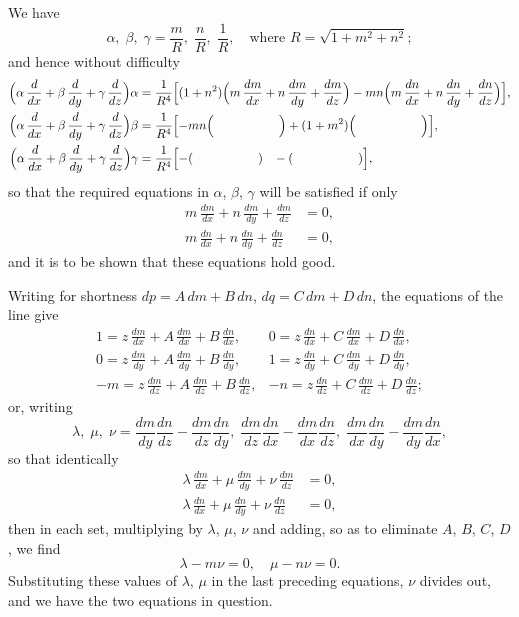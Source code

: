 \documentclass[12pt,a4paper]{article}
\begin{document}
We have
\[
\alpha,\; \beta,\; \gamma = \frac{m}{R},\; \frac{n}{R},\; \frac{1}{R}, \quad \text{where } R = \sqrt{1 + m^2 + n^2};
\]
and hence without difficulty
\begin{align*}
\Bigl(\alpha\,\frac{d}{dx} + \beta\,\frac{d}{dy} + \gamma\,\frac{d}{dz}\Bigr)\alpha &= \frac{1}{R^4}\Bigl[(1+n^2)\Bigl(m\,\frac{dm}{dx} + n\,\frac{dm}{dy} + \frac{dm}{dz}\Bigr) - mn\Bigl(m\,\frac{dn}{dx} + n\,\frac{dn}{dy} + \frac{dn}{dz}\Bigr)\Bigr], \\
\Bigl(\alpha\,\frac{d}{dx} + \beta\,\frac{d}{dy} + \gamma\,\frac{d}{dz}\Bigr)\beta &= \frac{1}{R^4}\Bigl[-mn\Bigl(\qquad\qquad\quad\;\Bigr) + (1+m^2)\Bigl(\qquad\qquad\quad\;\Bigr)\Bigr], \\
\Bigl(\alpha\,\frac{d}{dx} + \beta\,\frac{d}{dy} + \gamma\,\frac{d}{dz}\Bigr)\gamma &= \frac{1}{R^4}\Bigl[-(\qquad\qquad\quad\;)\;\;\; - (\qquad\qquad\quad\;)\Bigr],
\end{align*}
so that the required equations in $\alpha$, $\beta$, $\gamma$ will be satisfied if only
\begin{align*}
m\,\frac{dm}{dx} + n\,\frac{dm}{dy} + \frac{dm}{dz} &= 0, \\
m\,\frac{dn}{dx} + n\,\frac{dn}{dy} + \frac{dn}{dz} &= 0,
\end{align*}
and it is to be shown that these equations hold good.

Writing for shortness $dp = A\,dm + B\,dn$, $dq = C\,dm + D\,dn$, the equations of the line give
\[
\begin{array}{c|c}
\displaystyle 1 = z\,\frac{dm}{dx} + A\,\frac{dm}{dx} + B\,\frac{dn}{dx}, & \displaystyle 0 = z\,\frac{dn}{dx} + C\,\frac{dm}{dx} + D\,\frac{dn}{dx}, \\[8pt]
\displaystyle 0 = z\,\frac{dm}{dy} + A\,\frac{dm}{dy} + B\,\frac{dn}{dy}, & \displaystyle 1 = z\,\frac{dn}{dy} + C\,\frac{dm}{dy} + D\,\frac{dn}{dy}, \\[8pt]
\displaystyle -m = z\,\frac{dm}{dz} + A\,\frac{dm}{dz} + B\,\frac{dn}{dz}, & \displaystyle -n = z\,\frac{dn}{dz} + C\,\frac{dm}{dz} + D\,\frac{dn}{dz};
\end{array}
\]
or, writing
\[
\lambda,\; \mu,\; \nu = \frac{dm}{dy}\frac{dn}{dz} - \frac{dm}{dz}\frac{dn}{dy},\; \frac{dm}{dz}\frac{dn}{dx} - \frac{dm}{dx}\frac{dn}{dz},\; \frac{dm}{dx}\frac{dn}{dy} - \frac{dm}{dy}\frac{dn}{dx},
\]
so that identically
\begin{align*}
\lambda\,\frac{dm}{dx} + \mu\,\frac{dm}{dy} + \nu\,\frac{dm}{dz} &= 0, \\
\lambda\,\frac{dn}{dx} + \mu\,\frac{dn}{dy} + \nu\,\frac{dn}{dz} &= 0,
\end{align*}
then in each set, multiplying by $\lambda$, $\mu$, $\nu$ and adding, so as to eliminate $A$, $B$, $C$, $D$, we find
\[
\lambda - m\nu = 0, \quad \mu - n\nu = 0.
\]
Substituting these values of $\lambda$, $\mu$ in the last preceding equations, $\nu$ divides out, and we have the two equations in question.
\end{document}
